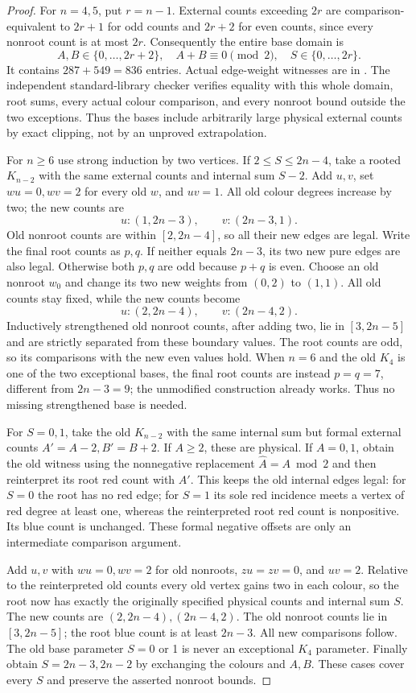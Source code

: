 \begin{proof}
For $n=4,5$, put $r=n-1$. External counts exceeding $2r$ are
comparison-equivalent to $2r+1$ for odd counts and $2r+2$ for even
counts, since every nonroot count is at most $2r$. Consequently the
entire base domain is
\[
 A,B\in\{0,\ldots,2r+2\},\quad A+B\equiv0\pmod2,
 \quad S\in\{0,\ldots,2r\}.
\]
It contains $287+549=836$ entries. Actual edge-weight witnesses are
in . The independent standard-library
checker  verifies equality with this
whole domain, root sums, every actual colour comparison, and every
nonroot bound outside the two exceptions. Thus the bases include
arbitrarily large physical external counts by exact clipping, not by
an unproved extrapolation.

For $n\ge6$ use strong induction by two vertices. If
$2\le S\le2n-4$, take a rooted $K_{n-2}$ with the same external
counts and internal sum $S-2$. Add $u,v$, set $wu=0,wv=2$ for
every old $w$, and $uv=1$. All old colour degrees increase by two;
the new counts are
\[
 u:(1,2n-3),\qquad v:(2n-3,1).
\]
Old nonroot counts are within $[2,2n-4]$, so all their new edges
are legal. Write the final root counts as $p,q$. If neither equals
$2n-3$, its two new pure edges are also legal. Otherwise both
$p,q$ are odd because $p+q$ is even. Choose an old nonroot $w_0$
and change its two new weights from $(0,2)$ to $(1,1)$. All old
counts stay fixed, while the new counts become
\[
 u:(2,2n-4),\qquad v:(2n-4,2).
\]
Inductively strengthened old nonroot counts, after adding two, lie
in $[3,2n-5]$ and are strictly separated from these boundary values.
The root counts are odd, so its comparisons with the new even values
hold. When $n=6$ and the old $K_4$ is one of the two exceptional
bases, the final root counts are instead $p=q=7$, different from
$2n-3=9$; the unmodified construction already works. Thus no missing
strengthened base is needed.

For $S=0,1$, take the old $K_{n-2}$ with the same internal sum but
formal external counts $A'=A-2,B'=B+2$. If $A\ge2$, these are
physical. If $A=0,1$, obtain the old witness using the nonnegative
replacement $\widehat A=A\bmod2$ and then reinterpret its root red
count with $A'$. This keeps the old internal edges legal: for $S=0$
the root has no red edge; for $S=1$ its sole red incidence meets a
vertex of red degree at least one, whereas the reinterpreted root
red count is nonpositive. Its blue count is unchanged. These formal
negative offsets are only an intermediate comparison argument.

Add $u,v$ with $wu=0,wv=2$ for old nonroots, $zu=zv=0$, and
$uv=2$. Relative to the reinterpreted old counts every old vertex
gains two in each colour, so the root now has exactly the originally
specified physical counts and internal sum $S$. The new counts are
$(2,2n-4),(2n-4,2)$. The old nonroot counts lie in $[3,2n-5]$;
the root blue count is at least $2n-3$. All new comparisons follow.
The old base parameter $S=0$ or 1 is never an exceptional $K_4$
parameter. Finally obtain $S=2n-3,2n-2$ by exchanging the colours
and $A,B$. These cases cover every $S$ and preserve the asserted
nonroot bounds.
\end{proof}

